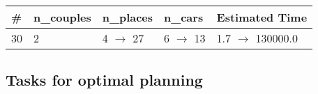 \documentclass{article}
\begin{document}
                        \begin{center}
                        \begin{tabular}{@{}l|l|l|l|l@{}}
                        \# & n\_couples & n\_places & n\_cars & Estimated Time\\\midrule
                        30&2&4 $\rightarrow$ 27&6 $\rightarrow$ 13&1.7 $\rightarrow$ 130000.0
                        \end{tabular}
                        \end{center}
                    
                                \subsection*{Tasks for optimal planning}
                                
\end{document}
